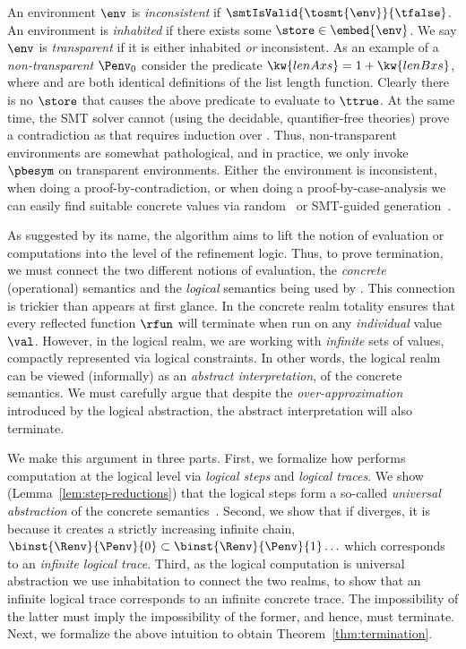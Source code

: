 %
An environment $\env$ is \emph{inconsistent}
if $\smtIsValid{\tosmt{\env}}{\tfalse}$.
%
An environment \env is \emph{inhabited}
if there exists some $\store \in \embed{\env}$.
%
We say $\env$ is \emph{transparent}
if it is either inhabited \emph{or}
inconsistent.
%
As an example of a \emph{non-transparent}
$\Penv_0$ consider the predicate
$\kw{lenA xs} = 1 + \kw{lenB xs}$,
where  and  are both
identical definitions of the list length
function.
%
Clearly there is no $\store$ that causes
the above predicate to evaluate to $\ttrue$.
%
At the same time, the SMT solver cannot
(using the decidable, quantifier-free theories)
prove a contradiction as that requires
induction over .
%
Thus, non-transparent environments are
somewhat pathological, and in practice,
we only invoke $\pbesym$ on transparent
environments.
%
Either the environment is inconsistent,
\eg when doing a proof-by-contradiction,
or \eg when doing a proof-by-case-analysis
we can easily find suitable concrete
values via random~\cite{Claessen00}
or SMT-guided generation~\cite{Seidel15}.

%
As suggested by its name, the
\pbesym algorithm aims to lift the
notion of evaluation or computations
into the level of the refinement logic.
%
Thus, to prove termination, we must
connect the two different notions of
evaluation,
the \emph{concrete} (operational) semantics
and
the \emph{logical} semantics being used by \pbesym.
%
This connection is trickier than appears at first glance.
%
In the concrete realm totality ensures that every
reflected function $\rfun$ will terminate when
run on any \emph{individual} value $\val$.
%
However, in the logical realm, we are working with
\emph{infinite} sets of values, compactly represented
via logical constraints.
%
In other words, the logical realm can be viewed
(informally) as an \emph{abstract interpretation},
of the concrete semantics. We must carefully argue
that despite the \emph{over-approximation} introduced
by the logical abstraction, the abstract interpretation
will also terminate.

%
We make this argument in three parts.
%
First, we formalize how \pbesym performs
computation at the logical level via
\emph{logical steps} and \emph{logical traces}.
We show (Lemma~\ref{lem:step-reductions})
that the logical steps form a so-called
\emph{universal abstraction} of the
concrete semantics~\cite{CousotCousot77,CGL92}.
%
Second, we show that if \pbesym diverges,
it is because it creates a strictly
increasing infinite chain,
$\binst{\Renv}{\Penv}{0} \subset \binst{\Renv}{\Penv}{1} \ldots$
which corresponds to an \emph{infinite logical trace}.
%
Third, as the logical computation
is universal abstraction we use
inhabitation to connect the two
realms, \ie to show that an
infinite logical trace
corresponds to an infinite
concrete trace.
%
The impossibility of the latter
must imply the impossibility of
the former, and hence, \pbesym
must terminate.
%
Next, we formalize the above
intuition to obtain
Theorem~\ref{thm:termination}.

